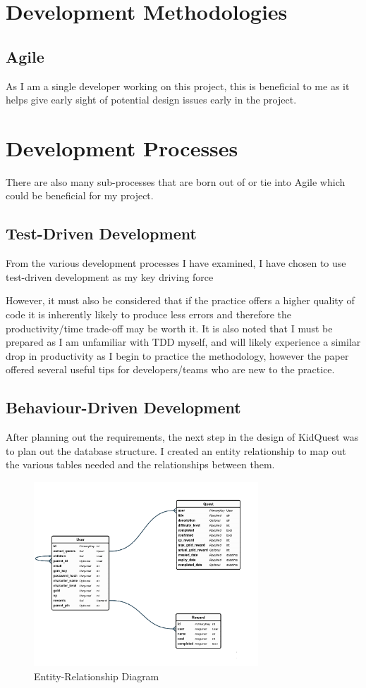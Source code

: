 \section{Development Methodologies}
\subsection{Agile}
As I am a single developer working on this project, this is beneficial to me as it helps give early sight of potential design issues early in the project.

\section{Development Processes}
There are also many sub-processes that are born out of or tie into Agile which could be beneficial for my project.

\subsection{Test-Driven Development}
From the various development processes I have examined, I have chosen to use test-driven development as my key driving force 

However, it must also be considered that if the practice offers a higher quality of code it is inherently likely to produce less errors and therefore the productivity/time trade-off may be worth it.
It is also noted that I must be prepared as I am unfamiliar with TDD myself, and will likely experience a similar drop in productivity as I begin to practice the methodology, however the paper offered several useful tips for developers/teams who are new to the practice.

\subsection{Behaviour-Driven Development}
After planning out the requirements, the next step in the design of KidQuest was to plan out the database structure.
I created an entity relationship to map out the various tables needed and the relationships between them.

\begin{figure}[t]
	\centering
	\includegraphics[width=0.75\textwidth]{images/entityRelationshipDiagram.png}
	\caption{Entity-Relationship Diagram}
	\label{fig:ERD}
\end{figure}

